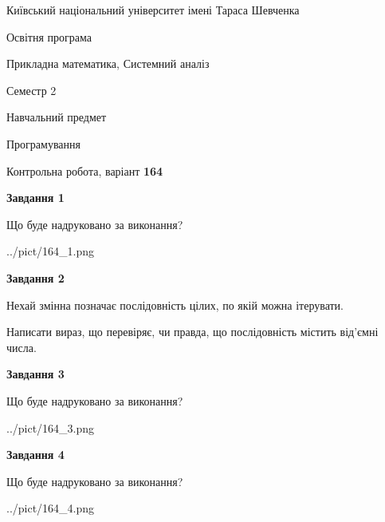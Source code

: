 \documentclass[12pt, ukrainian]{article}
\begin{document}
{{\begin {small}\par
{ \center  Київський національний університет імені Тараса Шевченка \par}
{\parbox {5 cm}{Освітня програма \hfill}{\parbox {8 cm}{Прикладна математика, Системний аналіз \hfill}}\parbox {5 cm}{\hfill Семестр 2}}\par
{\parbox {5 cm} {Навчальний предмет \hfill}\parbox {7 cm}{Програмування \hfill}\parbox {6cm}{\hfill}\par}\vspace{-7pt} \end{small}}{\center Контрольна робота, варіант  \No \textbf
{ 164 }\par}}
{
\begin {large}
{\begin {center}\textbf{Завдання 1}\end {center}}\par
Що буде надруковано за виконання?\par\par
\begin{center}
	{../pict/164_1.png}
\end{center}
\newpage

{\begin {center}\textbf{Завдання 2}\end {center}}\par
Нехай змінна  позначає послідовність цілих, по якій можна ітерувати.

Написати вираз, що перевіряє, чи правда, що послідовність  містить від’ємні числа.\par
\newpage

{\begin {center}\textbf{Завдання 3}\end {center}}\par
Що буде надруковано за виконання?\par
\begin{center}
	{../pict/164_3.png}
\end{center}
\newpage

{\begin {center}\textbf{Завдання 4}\end {center}}\par
Що буде надруковано за виконання?\par
\begin{center}
	{../pict/164_4.png}
\end{center}
\newpage


\end{large}}
\end{document}
